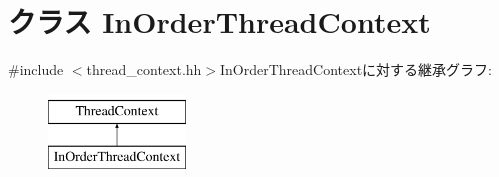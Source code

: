 \hypertarget{classInOrderThreadContext}{
\section{クラス InOrderThreadContext}
\label{classInOrderThreadContext}
}


{\ttfamily \#include $<$thread\_\-context.hh$>$}InOrderThreadContextに対する継承グラフ:\begin{figure}[H]
\begin{center}
\leavevmode
\includegraphics[height=2cm]{classInOrderThreadContext}
\end{center}
\end{figure}
